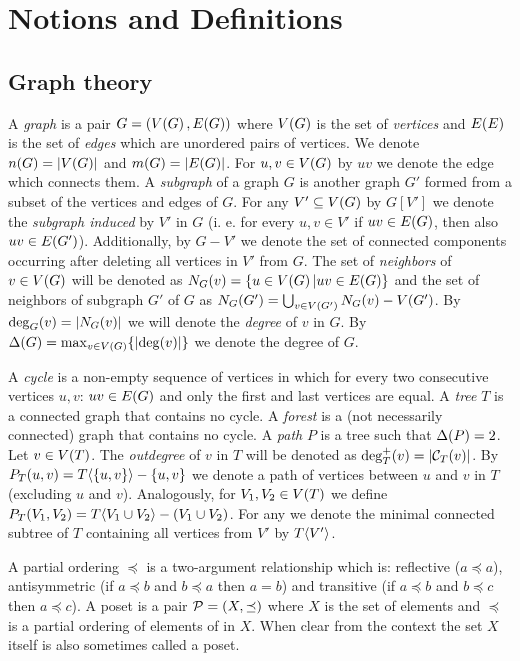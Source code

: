 \chapter{Notions and Definitions}

\section{Graph theory}
A \textit{\gls{graph}} is a pair $G=\mathopen{}\left( V\mathopen{}\left( G \right), E\mathopen{}\left( G \right) \right)$ where $V\mathopen{}\left( G \right)$ is the set of \textit{vertices} and $E\mathopen{}\left( E \right)$ is the set of \textit{edges} which are unordered pairs of vertices. We denote $n\mathopen{}\left( G \right)=\mathopen{}\left| V\mathopen{}\left( G \right) \right|$ and $m\mathopen{}\left( G \right)=\mathopen{}\left| E\mathopen{}\left( G \right) \right|$. For $u,v \in V\mathopen{}\left( G \right)$ by $uv$ we denote the edge which connects them. A \textit{subgraph} of a graph $G$ is another graph $G'$ formed from a subset of the vertices and edges of $G$. For any $V'\subseteq V\mathopen{}\left( G \right)$ by $G[V']$ we denote the \textit{subgraph induced} by $V'$ in $G$ (i. e. for every $u,v\in V'$ if $uv\in E\mathopen{}\left( G \right)$, then also $uv\in E\mathopen{}\left( G' \right)$).  Additionally, by $G-V'$ we denote the set of connected components occurring after deleting all vertices in $V'$ from $G$. The set of \textit{neighbors} of $v\in V\mathopen{}\left( G \right)$ will be denoted as $N_G\mathopen{}\left( v \right) = \mathopen{}\left\{ u\in V\mathopen{}\left( G \right)|uv\in E\mathopen{}\left( G \right) \right\}$ and the set of neighbors of subgraph $G'$ of $G$ as $N_G\mathopen{}\left( G' \right) = \bigcup_{v\in V\mathopen{}\left( G' \right)}N_G\mathopen{}\left( v \right)-V\mathopen{}\left( G' \right)$. By $\deg_{G}\mathopen{}\left( v \right)=\mathopen{}\left| N_G\mathopen{}\left( v \right) \right|$ we will denote the \textit{degree} of $v$ in $G$. By $\Delta\mathopen{}\left( G \right) = \max_{v\in V\mathopen{}\left( G \right)}\mathopen{}\left\{ \mathopen{}\left| \deg\mathopen{}\left( v \right) \right| \right\}$ we denote the degree of $G$.

A \textit{cycle} is a non-empty sequence of vertices in which for every two consecutive vertices $u,v$: $uv \in E\mathopen{}\left( G \right)$ and only the first and last vertices are equal. A \textit{tree} $T$ is a connected graph that contains no cycle. A \textit{forest} is a (not necessarily connected) graph that contains no cycle. A \textit{path} $P$ is a tree such that $\Delta\mathopen{}\left( P \right) = 2$. Let $v\in V\mathopen{}\left( T \right)$. The \textit{outdegree} of $v$ in $T$ will be denoted as $\deg_T^+\mathopen{}\left( v \right)=\mathopen{}\left| \mathcal{C}_T\mathopen{}\left( v \right) \right|$.
By $P_{T}\mathopen{}\left( u, v \right)=T\mathopen{}\langle \mathopen{}\left\{ u,v \right\} \rangle-\mathopen{}\left\{ u,v \right\}$ we denote a path of vertices between $u$ and $v$ in $T$ (excluding $u$ and $v$). Analogously, for $V_1,V_2\in V\mathopen{}\left( T \right)$ we define $P_{T}\mathopen{}\left( V_1, V_2 \right)=T\mathopen{}\langle V_1\cup V_2 \rangle-\mathopen{}\left( V_1\cup V_2 \right)$.
For any we denote the minimal connected subtree of $T$ containing all vertices from $V'$ by $T\mathopen{}\langle V' \rangle$.

A partial ordering $\preceq$ is a two-argument relationship which is: reflective ($a\preceq a$), antisymmetric (if $a\preceq b$ and $b \preceq a$ then $a=b$) and transitive (if $a\preceq b$ and $b \preceq c$ then $a\preceq c$).
A poset is a pair $\mathcal{P}=\mathopen{}\left( X, \preceq \right)$ where $X$ is the set of elements and $\preceq$ is a partial ordering of elements of in $X$. When clear from the context the set $X$ itself is also sometimes called a poset. 
